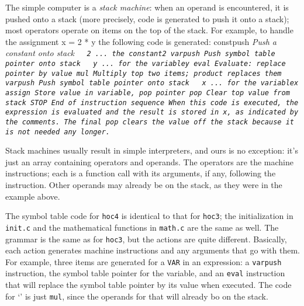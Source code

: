 {{The simple computer is a {\it stack machine\/}: when an operand
is encountered, it is pushed onto a stack (more precisely, code
is generated to push it onto a stack); most operators operate on
items on the top of the stack. For example, to handle the assignment
\begincode
x = 2 * y
\endcode
\noindent
the following code is generated:
\begincode
constpush          \it Push a constant onto stack\tt
~ 2                \it\quad... the constant\tt 2
varpush            \it Push symbol table pointer onto stack\tt
~ y                \it\quad... for the variable\tt y
eval               \it Evaluate: replace pointer by value\tt
mul                \it Multiply top two items; product replaces them\tt
varpush            \it Push symbol table pointer onto stack\tt
~ x                \it\quad... for the variable\tt x
assign             \it Store value in variable, pop pointer\tt
pop                \it Clear top value from stack\tt
STOP               \it End of instruction sequence
\endcode
\noindent
When this code is executed, the expression is evaluated and
the result is stored in {\tt x}, as indicated by the comments.
The final {\tt pop} clears the value off the stack because it
is not needed any longer.

Stack machines usually result in simple interpreters, and ours
is no exception: it's just an array containing operators and
operands. The operators are the machine instructions; each is a
function call with its arguments, if any, following the instruction.
Other operands may already be on the stack, as they were in the
example above.

The symbol table code for {\tt hoc4} is identical to that for
{\tt hoc3}; the initialization in {\tt init.c} and the mathematical
functions in {\tt math.c} are the same as well. The grammar is the
same as for {\tt hoc3}, but the actions are quite different.
Basically, each action generates machine instructions and any
arguments that go with them. For example, three items are generated
for a {\tt VAR} in an expression: a {\tt varpush} instruction,
the symbol table pointer for the variable, and an {\tt eval}
instruction that will replace the symbol table pointer by its
value when executed. The code for `{\tt*}' is just {\tt mul},
since the operands for that will already bo on the stack.

}}
